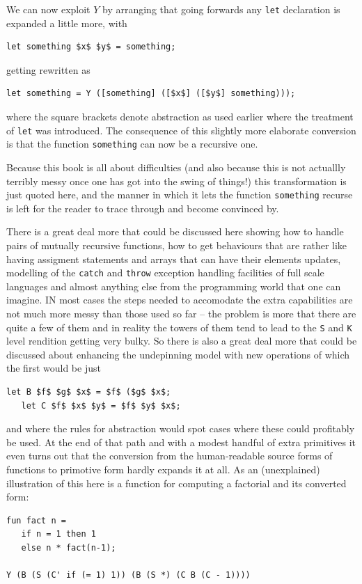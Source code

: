 We can now exploit $Y$ by arranging that going forwards any \verb+let+
declaration is expanded a little more, with
\begin{lstlisting}[mathescape=true]
   let something $x$ $y$ = something;
\end{lstlisting}
getting rewritten as
\begin{lstlisting}[mathescape=true]
   let something = Y ([something] ([$x$] ([$y$] something)));
\end{lstlisting}
where the square brackets denote abstraction as used earlier where the
treatment of \verb+let+ was introduced. The consequence of this slightly
more elaborate conversion is that the function \verb+something+ can now
be a recursive one.

Because this book is all about difficulties (and also because this is
not actuallly terribly messy once one has got into the swing of things!)
this transformation is just quoted here, and the manner in which
it lets the function \verb+something+ recurse is left for the reader
to trace through and become convinced by.

There is a great deal more that could be discussed here showing how
to handle pairs of mutually recursive functions, how to get behaviours
that are rather like having assigment statements and arrays that
can have their elements updates, modelling of the \verb+catch+ and
\verb+throw+ exception handling facilities of full scale languages and
almost anything else from the programming world that one can imagine.
IN most cases the steps needed to accomodate the extra capabilities are
not much more messy than those used so far -- the problem is more that
there are quite a few of them and in reality the towers of them tend to
lead to the \verb+S+ and \verb+K+ level rendition getting very bulky.
So there is also a great deal more that could be discussed about
enhancing the undepinning model with new operations of which the first
would be just
\begin{lstlisting}[mathescape=true]
   let B $f$ $g$ $x$ = $f$ ($g$ $x$;
   let C $f$ $x$ $y$ = $f$ $y$ $x$;
\end{lstlisting}
and where the rules for abstraction would spot cases where these could
profitably be used. At the end of that path and with a modest handful of
extra primitives it even turns out that the conversion from the
human-readable source forms of functions to primotive form hardly
expands it at all. As an (unexplained) illustration of this
here is a function for computing a factorial and its converted form:
\begin{verbatim}
fun fact n =
   if n = 1 then 1
   else n * fact(n-1);

Y (B (S (C' if (= 1) 1)) (B (S *) (C B (C - 1))))
\end{verbatim}

